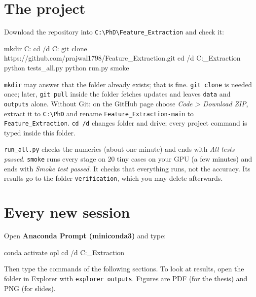 \documentclass[11pt,a4paper]{article}
\newcommand{\code}[1]{\lstinline{#1}}
\begin{document}
\section{The project}\label{sec:project}

Download the repository into \texttt{C:\textbackslash PhD\textbackslash Feature\_Extraction}
and check it:

\begin{cmd}
mkdir C:\PhD
cd /d C:\PhD
git clone https://github.com/prajwal1798/Feature_Extraction.git
cd /d C:\PhD\Feature_Extraction
python tests\run_all.py
python run.py smoke
\end{cmd}

\code{mkdir} may answer that the folder already exists; that is fine. \code{git clone} is needed
once; later, \code{git pull} inside the folder fetches updates and leaves \code{data} and
\code{outputs} alone. Without Git: on the GitHub page choose \emph{Code > Download ZIP},
extract it to \texttt{C:\textbackslash PhD} and rename \texttt{Feature\_Extraction-main} to
\texttt{Feature\_Extraction}. \code{cd /d} changes folder and drive; every project command is
typed inside this folder.

\code{run_all.py} checks the numerics (about one minute) and ends with \emph{All tests passed}.
\code{smoke} runs every stage on 20 tiny cases on your GPU (a few minutes) and ends with
\emph{Smoke test passed}. It checks that everything runs, not the accuracy. Its results go to
the folder \code{verification}, which you may delete afterwards.

\section{Every new session}\label{sec:everyday}

Open \textbf{Anaconda Prompt (miniconda3)} and type:

\begin{cmd}
conda activate opl
cd /d C:\PhD\Feature_Extraction
\end{cmd}

Then type the commands of the following sections. To look at results, open the folder in
Explorer with \code{explorer outputs}. Figures are PDF (for the thesis) and PNG (for slides).
\end{document}
